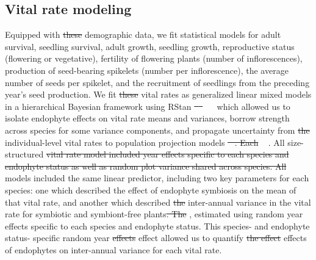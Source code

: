 \documentclass[lineno, sn-basic]{sn-jnl}%
\providecommand{\DIFadd}[1]{{\protect\color{blue}#1}} %
\providecommand{\DIFdel}[1]{{\protect\color{red}\protect\scriptsize\sout{#1}}}
\providecommand{\DIFadd}[1]{{\protect\color{blue}\uwave{#1}}} %
\providecommand{\DIFdel}[1]{{\protect\color{red}\sout{#1}}}                      %
\providecommand{\DIFaddbegin}{} %
\providecommand{\DIFaddend}{} %
\providecommand{\DIFdelbegin}{} %
\providecommand{\DIFdelend}{} %
\newcommand{\DIFscaledelfig}{0.5}
\newlength{\DIFdelgraphicswidth} %
\newlength{\DIFdelgraphicsheight} %
\newcommand{\DIFaddincludegraphics}[2][]{{\color{blue}\fbox{\DIFOincludegraphics[#1]{#2}}}} %
\newcommand{\DIFdelincludegraphics}[2][]{%
\sbox{\DIFdelgraphicsbox}{\DIFOincludegraphics[#1]{#2}}%
\settoboxwidth{\DIFdelgraphicswidth}{\DIFdelgraphicsbox} %
\settoboxtotalheight{\DIFdelgraphicsheight}{\DIFdelgraphicsbox} %
\scalebox{\DIFscaledelfig}{%
\parbox[b]{\DIFdelgraphicswidth}{\usebox{\DIFdelgraphicsbox}\\[-\baselineskip] \rule{\DIFdelgraphicswidth}{0em}}\llap{\resizebox{\DIFdelgraphicswidth}{\DIFdelgraphicsheight}{%
\setlength{\unitlength}{\DIFdelgraphicswidth}%
\begin{picture}(1,1)%
\thicklines\linethickness{2pt} %
{\color[rgb]{1,0,0}\put(0,0){\framebox(1,1){}}}%
{\color[rgb]{1,0,0}\put(0,0){\line( 1,1){1}}}%
{\color[rgb]{1,0,0}\put(0,1){\line(1,-1){1}}}%
\end{picture}%
}\hspace*{3pt}}} %
} %
\DeclareRobustCommand{\DIFaddbegin}{\DIFOaddbegin \let\includegraphics\DIFaddincludegraphics} %
\DeclareRobustCommand{\DIFaddend}{\DIFOaddend \let\includegraphics\DIFOincludegraphics} %
\DeclareRobustCommand{\DIFdelbegin}{\DIFOdelbegin \let\includegraphics\DIFdelincludegraphics} %
\DeclareRobustCommand{\DIFdelend}{\DIFOaddend \let\includegraphics\DIFOincludegraphics} %
\begin{document}
\DIFdelend \subsection*{Vital rate modeling}
Equipped with \DIFdelbegin \DIFdel{these }\DIFdelend demographic data, we fit statistical models for adult survival, seedling survival, adult growth, seedling growth, reproductive status (flowering or vegetative), fertility of flowering plants (number of inflorescences), production of seed-bearing spikelets (number per inflorescence), the average number of seeds per spikelet, and the recruitment of seedlings from the preceding year's seed production.
We fit \DIFdelbegin \DIFdel{these }\DIFdelend vital rates as generalized linear mixed models in a hierarchical Bayesian framework using RStan \DIFdelbegin \DIFdel{\mbox{%
\cite{rstan2022} }\hspace{0pt}%
}\DIFdelend \DIFaddbegin \DIFadd{\mbox{%
\citep{rstan2022} }\hspace{0pt}%
}\DIFaddend which allowed us to isolate endophyte effects on vital rate means and variances, borrow strength across species for some variance components, and propagate uncertainty from \DIFdelbegin \DIFdel{the }\DIFdelend individual-level vital rates to population projection models \DIFdelbegin \DIFdel{\mbox{%
\cite{elderd2016quantifying}}\hspace{0pt}%
. 
Each }\DIFdelend \DIFaddbegin \DIFadd{\mbox{%
\citep{elderd2016quantifying}}\hspace{0pt}%
. 
All }\DIFaddend size-structured \DIFdelbegin \DIFdel{vital rate model included year effects specific to each species and endophyte status as well as random plot variance shared across species. 
	All }\DIFdelend models included the same linear predictor, including two key parameters for each species: one which described the effect of endophyte symbiosis on the mean of that vital rate, and another which described \DIFdelbegin \DIFdel{the }\DIFdelend inter-annual variance in the vital rate for symbiotic and symbiont-free plants\DIFdelbegin \DIFdel{. 
	The }\DIFdelend \DIFaddbegin \DIFadd{, estimated using random year effects specific to each species and endophyte status. 
This }\DIFaddend species- and endophyte status- specific random year \DIFdelbegin \DIFdel{effects }\DIFdelend \DIFaddbegin \DIFadd{effect }\DIFaddend allowed us to quantify \DIFdelbegin \DIFdel{the effect }\DIFdelend \DIFaddbegin \DIFadd{effects }\DIFaddend of endophytes on inter-annual variance for each vital rate. 
\end{document}
